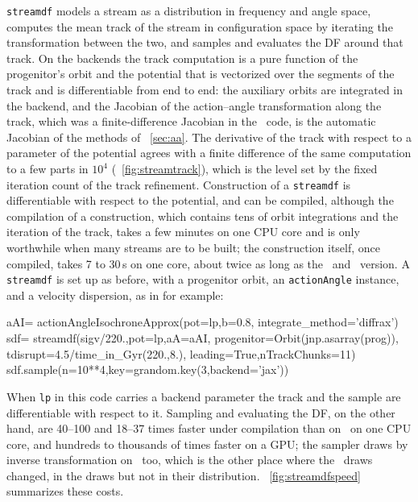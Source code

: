 \texttt{streamdf} models a stream as a distribution in frequency and
angle space, computes the mean track of the stream in configuration
space by iterating the transformation between the two, and samples and
evaluates the DF around that track. On the backends the track
computation is a pure function of the progenitor's orbit and the
potential that is vectorized over the segments of the track and is
differentiable from end to end: the auxiliary orbits are integrated in
the backend, and the Jacobian of the action--angle transformation along
the track, which was a finite-difference Jacobian in the \numpy\ code,
is the automatic Jacobian of the methods of \sectionname~\ref{sec:aa}.
The derivative of the track with respect to a parameter of the
potential agrees with a finite difference of the same computation to a
few parts in $10^4$ (\figurename~\ref{fig:streamtrack}), which is the
level set by the fixed iteration count of the track refinement. Construction of a \texttt{streamdf} is
differentiable with respect to the potential, and can be compiled,
although the compilation of a construction, which contains tens of
orbit integrations and the iteration of the track, takes a few minutes
on one CPU core and is only worthwhile when many streams are to be
built; the construction itself, once compiled, takes 7 to 30\,s on one
core, about twice as long as the \numpy\ and \cc\ version.
A \texttt{streamdf} is set up as before, with a progenitor orbit, an
\texttt{actionAngle} instance, and a velocity dispersion, as in for example:
\begin{code}
aAI= actionAngleIsochroneApprox(pot=lp,b=0.8,
        integrate_method='diffrax')
sdf= streamdf(sigv/220.,pot=lp,aA=aAI,
              progenitor=Orbit(jnp.asarray(prog)),
              tdisrupt=4.5/time_in_Gyr(220.,8.),
              leading=True,nTrackChunks=11)
sdf.sample(n=10**4,key=grandom.key(3,backend='jax'))
\end{code}
When \texttt{lp} in this code carries a backend parameter the track and the
sample are differentiable with respect to it. Sampling and evaluating
the DF, on the other hand, are 40--100 and 18--37 times faster under
compilation than on \numpy\ on one CPU core, and hundreds to thousands
of times faster on a GPU;
the sampler draws by inverse transformation on \numpy\ too, which is the
other place where the \numpy\ draws changed, in the draws but not in
their distribution. \figurename~\ref{fig:streamdfspeed} summarizes these
costs.

